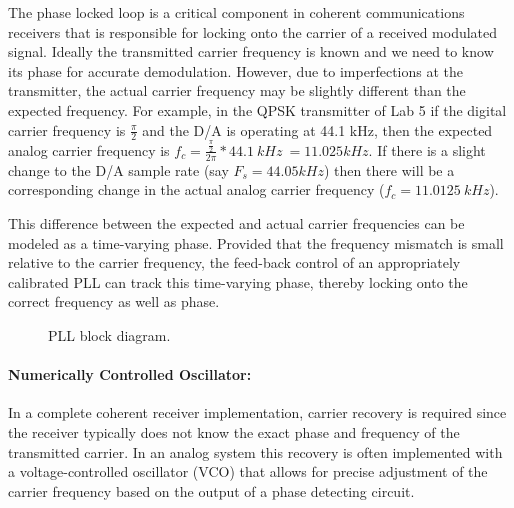 
%
% 
%
%
%

The phase locked loop is a critical component in coherent communications
receivers that is responsible for locking onto the carrier of a received 
modulated signal.  
Ideally the transmitted carrier frequency is known and we need
to know its phase for accurate demodulation.  However, due
to imperfections at the transmitter, the actual carrier frequency
may be slightly different than the expected frequency.  For example, in the 
QPSK transmitter of Lab 5 if the digital carrier frequency is $\frac{\pi}{2}$
and the D/A is operating at 44.1 kHz, then the expected analog carrier 
frequency is $f_c = \frac{\frac{\pi}{2}}{2 \pi} * 44.1 \: kHz \: = 11.025 kHz$.
If there is a slight change to the D/A sample rate 
(say $F_s = 44.05 kHz$) then there will be a corresponding 
change in the actual analog carrier frequency ($f_c = 11.0125 \: kHz$).

This difference between the expected and actual carrier frequencies
can be modeled as a time-varying phase.  
Provided that the frequency mismatch is small relative to the
carrier frequency, the feed-back control of an appropriately
calibrated PLL can track this time-varying phase, thereby locking
onto the correct frequency as well as phase.

\begin{figure}[ht]
   \begin{center}
      \caption{PLL block diagram.}
      \label{fig: PLL}
   \end{center}
\end{figure}

\paragraph{Numerically Controlled Oscillator:}

In a complete coherent receiver implementation, carrier
recovery is required since the receiver typically does not know
the exact phase and frequency of the transmitted carrier.
In an analog system this recovery is often implemented with
a voltage-controlled oscillator (VCO) that allows for precise
adjustment of the carrier frequency based on the output of
a phase detecting circuit.

